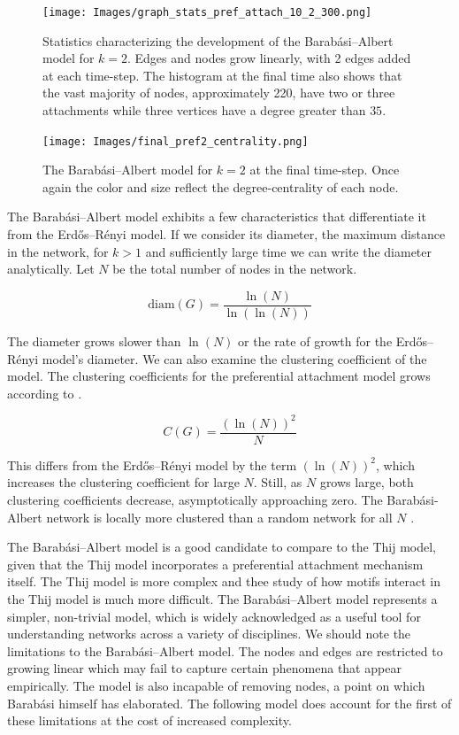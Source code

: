 \begin{figure}[h!]
    \texttt{[image: Images/graph\_stats\_pref\_attach\_10\_2\_300.png]}
    \centering
    \caption{Statistics characterizing the development of the Barabási–Albert model for $k=2$.
    Edges and nodes grow linearly, with 2 edges added at each time-step. The histogram at
    the final time also shows that the vast majority of nodes, approximately 220, have two or three attachments
    while three vertices have a degree greater than $35$.}
\end{figure}

\begin{figure}
    \texttt{[image: Images/final\_pref2\_centrality.png]}
    \centering
    \caption{The Barabási–Albert model for $k=2$ at the final time-step. Once again the color and size
            reflect the degree-centrality of each node.}
\end{figure}

The Barabási–Albert model exhibits a few characteristics that differentiate it from the 
Erdős–Rényi model. If we consider its diameter, the maximum distance in the network,
for $k>1$ and sufficiently large time we can write the diameter analytically. Let $N$ be the 
total number of nodes in the network.

$$\text{diam}(G) = \frac{\ln(N)}{\ln(\ln (N))}$$

The diameter grows slower than $\ln(N)$ or the rate of growth for the
Erdős–Rényi model's diameter. We can also examine the clustering coefficient of the model. 
The clustering coefficients for the preferential attachment model grows according to \cite{klemm_2002}.

$$
C(G) = \frac{(\ln (N))^2}{N}
$$

This differs from the Erdős–Rényi model by the term $(\ln (N))^2$,
which increases the clustering coefficient for large $N$. Still, as $N$ grows large,
both clustering coefficients
decrease, asymptotically approaching zero. The Barabási-Albert network is locally
 more clustered than a random network for all $N$ \cite{barabasi2016network}.

The Barabási–Albert model is a good candidate to compare to the Thij model, given that the Thij model incorporates
a preferential attachment mechanism itself. The Thij model is more complex and thee study of how motifs interact
in the Thij model is much more difficult. The Barabási–Albert model 
represents a simpler, non-trivial model, which is widely acknowledged as a useful tool
for understanding networks across a variety of disciplines. We should note the 
limitations to the Barabási–Albert model. The nodes and edges are restricted to growing linear which
may fail to capture certain phenomena that appear empirically. The model is also incapable
 of removing nodes, a point on which Barabási himself has elaborated. The following model
 does account for the first of these limitations at the cost of increased complexity.

